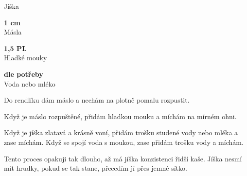 \documentclass[11pt,a4paper]{article}
\begin{document}
\begin{recipe}[NavyBlue]{Jíška}
    \begin{ingredients}
        \item \parbox[t]{\linewidth}{\raggedright \piece \textbf{1 cm}\\ Másla}
        \item \parbox[t]{\linewidth}{\raggedright \spoon \textbf{1,5 PL}\\ Hladké mouky}
        \item \parbox[t]{\linewidth}{\raggedright \liquid \textbf{dle potřeby}\\ Voda nebo mléko}
    \end{ingredients}
    \begin{steps}
        \item Do rendlíku dám máslo a nechám na plotně pomalu rozpustit. 
        \item Když je máslo rozpuštěné, přidám hladkou mouku a míchám na mírném ohni. 
        \item Když je jíška zlatavá a krásně voní, přidám trošku studené vody nebo mléka a zase míchám. Když se spojí voda s moukou, zase přidám trošku vody a míchám. 
        \item Tento proces opakuji tak dlouho, až má jíška konzistenci řidší kaše. Jíška nesmí mít hrudky, pokud se tak stane, přecedím jí přes jemné sítko.
    \end{steps}
\end{recipe}
\end{document}
